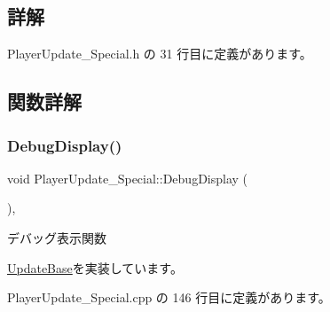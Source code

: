 \subsection{詳解}


 Player\+Update\+\_\+\+Special.\+h の 31 行目に定義があります。



\subsection{関数詳解}
\mbox{\label{class_player_update___special_a6253000b53b2c5bc73ce0ed4d3b4a82a}} 
\subsubsection{\texorpdfstring{Debug\+Display()}{DebugDisplay()}}
{\footnotesize\ttfamily void Player\+Update\+\_\+\+Special\+::\+Debug\+Display (\begin{DoxyParamCaption}{ }\end{DoxyParamCaption})\hspace{0.3cm}{\ttfamily [override]}, {\ttfamily [virtual]}}



デバッグ表示関数 



\mbox{\hyperlink{class_update_base_a5c63c3c3ef1b85f3701718ec3f7b39e2}{Update\+Base}}を実装しています。



 Player\+Update\+\_\+\+Special.\+cpp の 146 行目に定義があります。

